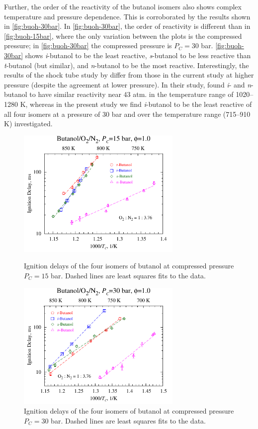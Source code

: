 \documentclass[12pt, letterpaper]{article}
\begin{document}
Further, the order of the reactivity of the butanol isomers also shows complex
temperature and pressure dependence. This is corroborated by the results shown
in \autoref{fig:buoh-30bar}. In \autoref{fig:buoh-30bar}, the order of
reactivity is different than in \autoref{fig:buoh-15bar}, where the only
variation between the plots is the compressed pressure; in
\autoref{fig:buoh-30bar} the compressed pressure is $P_C=30$ bar.
\autoref{fig:buoh-30bar} shows \textit{i}-butanol to be the least reactive,
\textit{s}-butanol to be less reactive than \textit{t}-butanol (but similar),
and \textit{n}-butanol to be the most reactive. Interestingly, the results of
the shock tube study by \textcite{Stranic2012} differ from those in the current
study at higher pressure (despite the agreement at lower pressure). In their
study, \textcite{Stranic2012} found \textit{i}- and \textit{n}-butanol to have
similar reactivity near 43 atm. in the temperature range of 1020--1280 K,
whereas in the present study we find \textit{i}-butanol to be the least
reactive of all four isomers at a pressure of 30 bar and over the temperature
range (715–910 K) investigated.

\begin{figure}
    \centering
    \begin{minipage}{7.9cm}
        \includegraphics[width=7.9cm]{03-Butanol/buoh-15bar}
        \caption{Ignition delays of the four isomers of butanol at compressed
            pressure $P_C=15$ bar. Dashed lines are least squares fits to the
            data.}
        \label{fig:buoh-15bar}
    \end{minipage}
    \quad
    \begin{minipage}{7.9cm}
        \includegraphics[width=7.9cm]{03-Butanol/buoh-30bar}
        \caption{Ignition delays of the four isomers of butanol at compressed
            pressure $P_C=30$ bar. Dashed lines are least squares fits to the
            data.}
        \label{fig:buoh-30bar}
    \end{minipage}
\end{figure}
\end{document}
